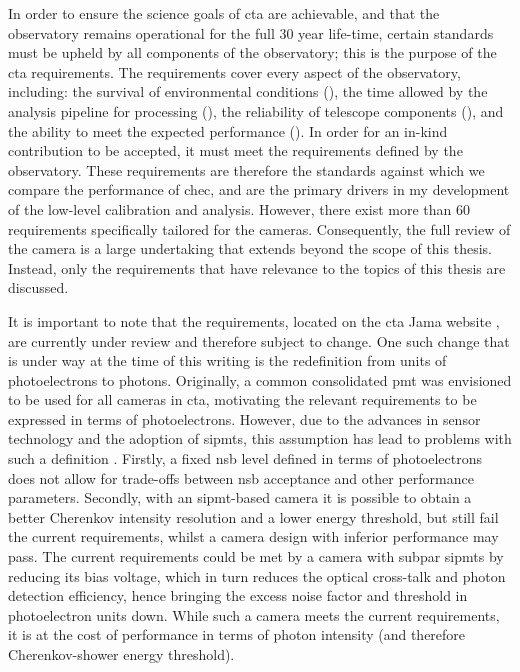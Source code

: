 In order to ensure the science goals of \gls{cta} are achievable, and that the observatory remains operational for the full 30 year life-time, certain standards must be upheld by all components of the observatory; this is the purpose of the \gls{cta} requirements. The requirements cover every aspect of the observatory, including: the survival of environmental conditions (), the time allowed by the analysis pipeline for processing (), the reliability of telescope components (), and the ability to meet the expected performance (). In order for an in-kind contribution to be accepted, it must meet the requirements defined by the observatory. These requirements are therefore the standards against which we compare the performance of \gls{chec}, and are the primary drivers in my development of the low-level calibration and analysis. However, there exist more than 60 requirements specifically tailored for the cameras. Consequently, the full review of the camera is a large undertaking that extends beyond the scope of this thesis. Instead, only the requirements that have relevance to the topics of this thesis are discussed.

It is important to note that the requirements, located on the \gls{cta} Jama website \cite{cta-jama}, are currently under review and therefore subject to change. One such change that is under way at the time of this writing is the redefinition from units of photoelectrons to photons. Originally, a common consolidated \gls{pmt} was envisioned to be used for all cameras in \gls{cta}, motivating the relevant requirements to be expressed in terms of photoelectrons. However, due to the advances in sensor technology and the adoption of \glspl{sipmt}, this assumption has lead to problems with such a definition \cite{petophotons}. Firstly, a fixed \gls{nsb} level defined in terms of photoelectrons does not allow for trade-offs between \gls{nsb} acceptance and other performance parameters. Secondly, with an \gls{sipmt}-based camera it is possible to obtain a better Cherenkov intensity resolution and a lower energy threshold, but still fail the current requirements, whilst a camera design with inferior performance may pass. The current requirements could be met by a camera with subpar \glspl{sipmt} by reducing its bias voltage, which in turn reduces the optical cross-talk and photon detection efficiency, hence bringing the excess noise factor and threshold in photoelectron units down. While such a camera meets the current requirements, it is at the cost of performance in terms of photon intensity (and therefore Cherenkov-shower energy threshold).


